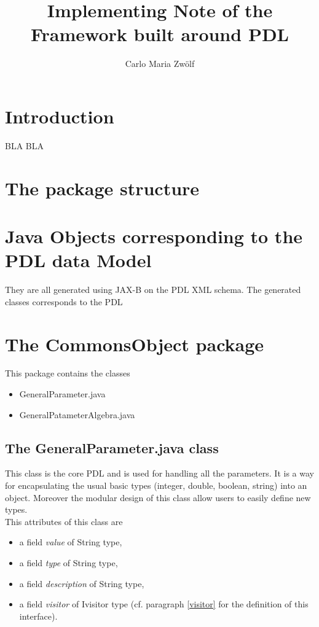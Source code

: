 \documentclass[a4paper,11pt] {ivoa}
\title{Implementing Note of the Framework built around PDL}
\author{Carlo Maria Zw\"olf}
\date{\pdldate}
\begin{document}
\maketitle

\newpage

\tableofcontents

\newpage

\section{Introduction}\label{intro}
BLA BLA

\section{The package structure}

\section{Java Objects corresponding to the PDL data Model}
They are all generated using JAX-B on the PDL XML schema. The generated classes corresponds to the PDL 


\section{The CommonsObject package}\label{commons}
This package contains the classes 
\begin{itemize}
\item GeneralParameter.java
\item GeneralPatameterAlgebra.java
\end{itemize}

\subsection{The  GeneralParameter.java class }\label{generalParameter}
This class is the core PDL and is used for handling all the parameters. It is a way for encapsulating the usual basic types (integer, double, boolean, string) into an object. Moreover the modular design of this class allow users to easily define new types.\\

This attributes of this class are
\begin{itemize}
\item a field {\it value} of String type,\\
\item a field {\it type} of String type,\\
\item a field {\it description} of String type,\\
\item a field {\it visitor} of Ivisitor type (cf. paragraph \ref{visitor} for the definition of this interface).\\ 
\end{itemize}
\end{document}
